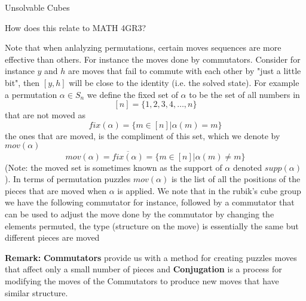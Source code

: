 \documentclass[final]{beamer}
\newlength{\colwidth}
\begin{document}
\begin{frame}[t]
\begin{columns}[t]
\begin{column}{\colwidth}
\begin{block}{Unsolvable Cubes}

  \end{block}

  \begin{alertblock}{How does this relate to MATH 4GR3?}


    Note that when anlalyzing permutations, certain moves sequences are more effective than others. For instance the moves done by commutators.
    Consider for instance $y$ and $h$ are moves that fail to commute with each other by "just a little bit",
    then $[y,h]$ will be close to the identity (i.e. the solved state). For example a permutation $\alpha \in S_{n}$ we define the fixed set of $\alpha$ to be the set of all numbers in
    $$[n] = \{1,2,3,4,\dots,n\}$$
    that are not moved as
    $$fix(\alpha) = \{m \in [n] | \alpha(m) = m\}$$ 
    the ones that are moved, is the compliment of this set, which we denote by $mov(\alpha)$
    $$mov(\alpha) = \overline{fix(\alpha)} = \{m \in [n] | \alpha(m) \neq m\}$$
    (Note: the moved set is sometimes known as the support of $\alpha$ denoted $supp(\alpha)$).
    In terms of permutation puzzles $mov(\alpha)$ is the list of all the positions of the pieces that are moved when $\alpha$ is applied.
    We note that in the rubik's cube group we have the following commutator for instance, followed by a commutator that
    can be used to adjust the move done by the commutator by changing the elements permuted, the type (structure on the move) is essentially
    the same but different pieces are moved
    
\textbf{Remark:} 
\textbf{Commutators} provide us with a method for creating puzzles moves that affect only a small number of pieces and \textbf{Conjugation} is a process for modifying the moves of the Commutators to produce new moves that have similar structure.



\end{alertblock}
\end{column}
\end{columns}
\end{frame}
\end{document}
